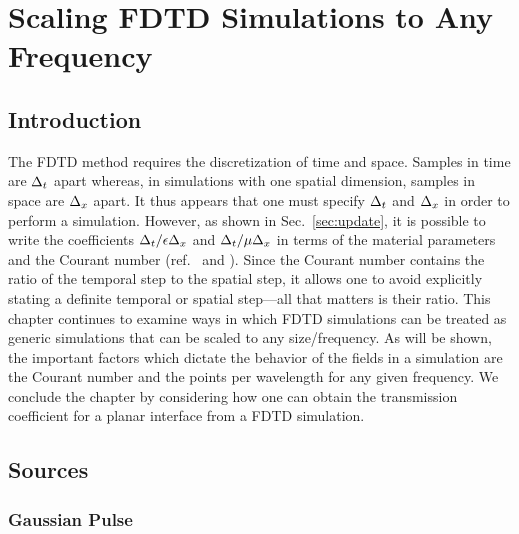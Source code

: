 \chapter{Scaling FDTD Simulations to Any Frequency
 \label{chap:dimensionless}}


\renewcommand{\thefootnote}{\fnsymbol{footnote}}

\section{Introduction}

The FDTD method requires the discretization of time and space.
Samples in time are $\Delta_t$ apart whereas, in simulations with one
spatial dimension, samples in space are $\Delta_x$ apart.  It thus
appears that one must specify $\Delta_t$ and $\Delta_x$ in order to perform
a simulation.  However, as shown in Sec.\ \ref{sec:update}, it is
possible to write the coefficients $\Delta_t/\epsilon\Delta_x$ and
$\Delta_t/\mu\Delta_x$ in terms of the material parameters and the Courant
number (ref.\  and ).  Since the
Courant number contains the ratio of the temporal step to the spatial
step, it allows one to avoid explicitly stating a definite temporal or
spatial step---all that matters is their ratio.  This chapter
continues to examine ways in which FDTD simulations can be treated as
generic simulations that can be scaled to any size/frequency.  As will
be shown, the important factors which dictate the behavior of the
fields in a simulation are the Courant number and the points per
wavelength for any given frequency.  We conclude the chapter by
considering how one can obtain the transmission coefficient for a
planar interface from a FDTD simulation.

\section{Sources}

\subsection{Gaussian Pulse}

